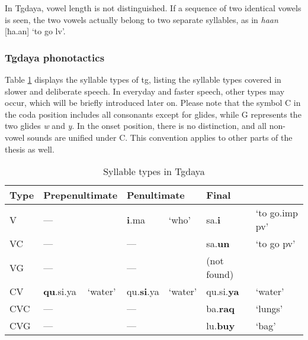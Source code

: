 In Tgdaya, vowel length is not distinguished. If a sequence of two identical vowels is seen, the two vowels actually belong to two separate syllables, as in \textit{haan} [ħa.an] `to go \acs{lv}'.

\subsubsection{Tgdaya phonotactics} \label{sec:tg_phonotactics}

Table \ref{tab:sy_ty_tg} displays the syllable types of \acl{tg}, listing the syllable types covered in slower and deliberate speech. In everyday and faster speech, other types may occur, which will be briefly introduced later on. Please note that the symbol C in the coda position includes all consonants except for glides, while G represents the two glides \textit{w} and \textit{y}. In the onset position, there is no distinction, and all non-vowel sounds are unified under C. This convention applies to other parts of the thesis as well.

\begin{table}[!htbp]
\centering
\caption{Syllable types in Tgdaya}
\label{tab:sy_ty_tg}
\begin{tabular}{lllllll}
\hline
Type & \multicolumn{2}{l}{Prepenultimate} & \multicolumn{2}{l}{Penultimate} & \multicolumn{2}{l}{Final}                \\ \hline
V             & ---              &                 & \textbf{i}.ma            & `who'         & sa.\textbf{i}        & `to go.\acs{imp} \acs{pv}' \\
VC            & ---              &                 & ---             &               & sa.\textbf{un}       & `to go \acs{pv}'           \\
VG            & ---              &                 & ---             &               & (not found) &                            \\
CV            & \textbf{qu}.si.ya         & `water'         & qu.\textbf{si}.ya        & `water'       & qu.si.\textbf{ya}    & `water'                    \\
CVC           & ---              &                 & ---             &               & ba.\textbf{raq}      & `lungs'                    \\
CVG           & ---              &                 & ---             &               & lu.\textbf{buy}      & `bag'                     \\ \hline
\end{tabular}
\end{table}

